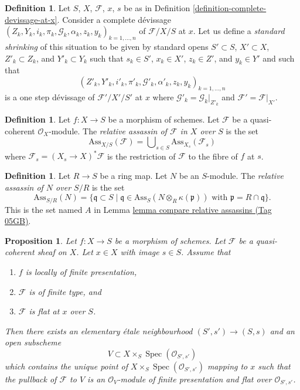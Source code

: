 \documentclass{amsart}
\theoremstyle{plain}
\newtheorem{proposition}[subsection]{Proposition}
\theoremstyle{definition}
\newtheorem{definition}[subsection]{Definition}
\theoremstyle{remark}
\numberwithin{equation}{subsection}
\def\Spec{\mathop{\mathrm{Spec}}}
\begin{document}
\begin{definition}
\label{definition-shrink-complete}
Let $S$, $X$, $\mathcal{F}$, $x$, $s$ be as in
Definition \ref{definition-complete-devissage-at-x}.
Consider a complete d\'evissage
$(Z_k, Y_k, i_k, \pi_k, \mathcal{G}_k, \alpha_k, z_k, y_k)_{k = 1, \ldots, n}$
of $\mathcal{F}/X/S$ at $x$. Let us define a
{\it standard shrinking} of this situation to be
given by standard opens $S' \subset S$, $X' \subset X$,
$Z'_k \subset Z_k$, and $Y'_k \subset Y_k$ such that $s_k \in S'$,
$x_k \in X'$, $z_k \in Z'$, and $y_k \in Y'$ and such that
$$
(Z'_k, Y'_k, i'_k, \pi'_k,
\mathcal{G}'_k, \alpha'_k, z_k, y_k)_{k = 1, \ldots, n}
$$
is a one step d\'evissage of $\mathcal{F}'/X'/S'$ at $x$ where
$\mathcal{G}'_k = \mathcal{G}_k|_{Z'_k}$ and
$\mathcal{F}' = \mathcal{F}|_{X'}$.
\end{definition}

\begin{definition}
\label{divisors-definition-relative-assassin}
Let $f : X \to S$ be a morphism of schemes.
Let $\mathcal{F}$ be a quasi-coherent $\mathcal{O}_X$-module.
The {\it relative assassin of $\mathcal{F}$ in $X$ over $S$}
is the set
$$
\text{Ass}_{X/S}(\mathcal{F}) =
\bigcup\nolimits_{s \in S} \text{Ass}_{X_s}(\mathcal{F}_s)
$$
where $\mathcal{F}_s = (X_s \to X)^*\mathcal{F}$ is the restriction
of $\mathcal{F}$ to the fibre of $f$ at $s$.
\end{definition}

\begin{definition}
\label{algebra-definition-relative-assassin}
Let $R \to S$ be a ring map. Let $N$ be an $S$-module.
The {\it relative assassin of $N$ over $S/R$} is the set
$$
\text{Ass}_{S/R}(N)
=
\{ \mathfrak q \subset S \mid
\mathfrak q \in \text{Ass}_S(N \otimes_R \kappa(\mathfrak p))
\text{ with }\mathfrak p = R \cap \mathfrak q\}.
$$
This is the set named $A$ in
Lemma \href{https://stacks.math.columbia.edu/tag/05GB}{lemma compare relative assassins (Tag 05GB)}.
\end{definition}

\begin{proposition}
\label{proposition-finite-type-flat-at-point}
Let $f : X \to S$ be a morphism of schemes.
Let $\mathcal{F}$ be a quasi-coherent sheaf on $X$.
Let $x \in X$ with image $s \in S$.
Assume that
\begin{enumerate}
\item $f$ is locally of finite presentation,
\item $\mathcal{F}$ is of finite type, and
\item $\mathcal{F}$ is flat at $x$ over $S$.
\end{enumerate}
Then there exists an elementary \'etale neighbourhood $(S', s') \to (S, s)$
and an open subscheme
$$
V \subset X \times_S \Spec(\mathcal{O}_{S', s'})
$$
which contains the unique point of
$X \times_S \Spec(\mathcal{O}_{S', s'})$ mapping to $x$
such that the pullback of $\mathcal{F}$ to $V$ is an $\mathcal{O}_V$-module
of finite presentation and flat over $\mathcal{O}_{S', s'}$.
\end{proposition}
\end{document}
